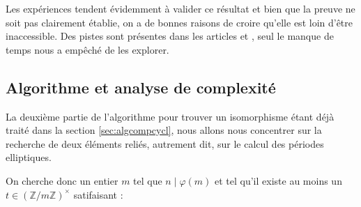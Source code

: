 \documentclass[a4paper]{article} %
\numberwithin{section}{part}
\numberwithin{equation}{section}
\newcommand\zmodninv[1]{(\mathbb{Z}/#1\mathbb{Z})^{\times}}
\newcommand\GF[1]{\mathbb{F}_{#1}}
\newcommand\QQ{\mathbb{Q}}
\newcommand\groupgen[1]{\langle{#1}\rangle}
\begin{document}

\begin{rem}
Les expériences tendent évidemment à valider ce résultat et bien que la preuve 
ne soit pas clairement établie, on a de bonnes raisons de croire qu'elle est 
loin d'être inaccessible. Des pistes sont présentes dans 
les articles \cite{MiMoScho} et \cite{CouRe}, seul le manque de temps nous a
empêché de les explorer. 
\end{rem}

\subsection{Algorithme et analyse de complexité}
\label{sec:algcompell}
La deuxième partie de l'algorithme pour trouver un isomorphisme étant déjà 
traité dans la section \ref{sec:algcompcycl}, nous allons nous concentrer sur la
recherche de deux éléments reliés, autrement dit, sur le calcul des périodes 
elliptiques.\par
On cherche donc un entier $m$ tel que $n\mid\varphi(m)$ et tel qu'il existe au 
moins un $t\in\zmodninv{m}$ satifaisant :
\end{document}
